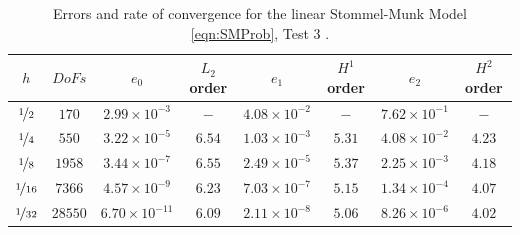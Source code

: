 \begin{table}%
\begin{center}
\begin{tabular}{|c|c|c|c|c|c|c|c|}%
  \hline
  $h$ & $DoFs$ & $e_0$ & $L_2$ order & $e_1$ & $H^1$ order & $e_2$ & $H^2$ order \\[0.2em] %
  \hline
  $\nicefrac{1}{2}$ & $170$ & $2.99\times 10^{-3}$ & $-$ & $4.08\times 10^{-2}$ & $-$ & $7.62\times 10^{-1}$ & $-$ \\[0.2em] %
  $\nicefrac{1}{4}$ & $550$ & $3.22\times 10^{-5}$ & $6.54$ & $1.03\times 10^{-3}$ & $5.31$ & $4.08\times 10^{-2}$ & $4.23$ \\[0.2em] %
  $\nicefrac{1}{8}$ & $1958$ & $3.44\times 10^{-7}$ & $6.55$ & $2.49\times 10^{-5}$ & $5.37$ & $2.25\times 10^{-3}$ & $4.18$ \\[0.2em] %
  $\nicefrac{1}{16}$ & $7366$ & $4.57\times 10^{-9}$ & $6.23$ & $7.03\times 10^{-7}$ & $5.15$ & $1.34\times 10^{-4}$ & $4.07$ \\[0.2em] %
  $\nicefrac{1}{32}$ & $28550$ & $6.70\times 10^{-11}$ & $6.09$ & $2.11\times 10^{-8}$ & $5.06$ & $8.26\times 10^{-6}$ & $4.02$ \\[0.2em] %
 \hline
\end{tabular}
\end{center}
\caption{Errors and rate of convergence for the linear Stommel-Munk Model
  \eqref{eqn:SMProb}, Test 3 \cite{Cascon}.}
\label{tab:SMsinErrors}
\end{table}

